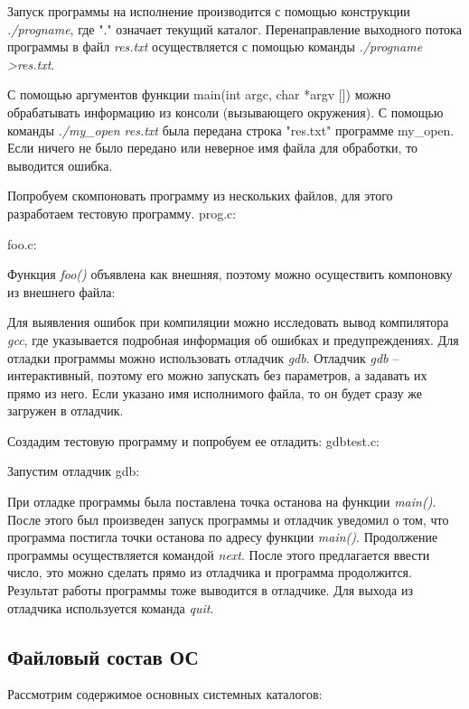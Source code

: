 \documentclass[14pt,a4paper,report]{report}
\begin{document}
Запуск программы на исполнение производится с помощью конструкции \emph{./progname}, где "." означает текущий каталог. Перенаправление выходного потока программы в файл \emph{res.txt} осуществляется с помощью команды \emph{./progname >res.txt}.

С помощью аргументов функции main(int argc, char *argv []) можно обрабатывать информацию из консоли (вызывающего окружения). С помощью команды \emph{./my\_open res.txt} была передана строка "res.txt" программе my\_open. Если ничего не было передано или неверное имя файла для обработки, то выводится ошибка.

Попробуем скомпоновать программу из нескольких файлов, для этого разработаем тестовую программу.
prog.c:

foo.c:


Функция \emph{foo()} объявлена как внешняя, поэтому можно осуществить компоновку из внешнего файла:



Для выявления ошибок при компиляции можно исследовать вывод компилятора \emph{gcc}, где указывается подробная информация об ошибках и предупреждениях. Для отладки программы можно использовать отладчик \emph{gdb}. Отладчик \emph{gdb} – интерактивный, поэтому его можно запускать без параметров, а задавать их прямо из него. Если указано имя исполнимого файла, то он будет сразу же загружен в отладчик.

Создадим тестовую программу и попробуем ее отладить:
gdbtest.c:

Запустим отладчик gdb:


При отладке программы была поставлена точка останова на функции \emph{main()}. После этого был произведен запуск программы и отладчик уведомил о том, что программа постигла точки останова по адресу функции \emph{main()}. Продолжение программы осуществляется командой \emph{next}. После этого предлагается ввести число, это можно сделать прямо из отладчика и программа продолжится. Результат работы программы тоже выводится в отладчике. Для выхода из отладчика используется команда \emph{quit}.

\subsection{Файловый состав ОС}

Рассмотрим содержимое основных системных каталогов:
\end{document}
